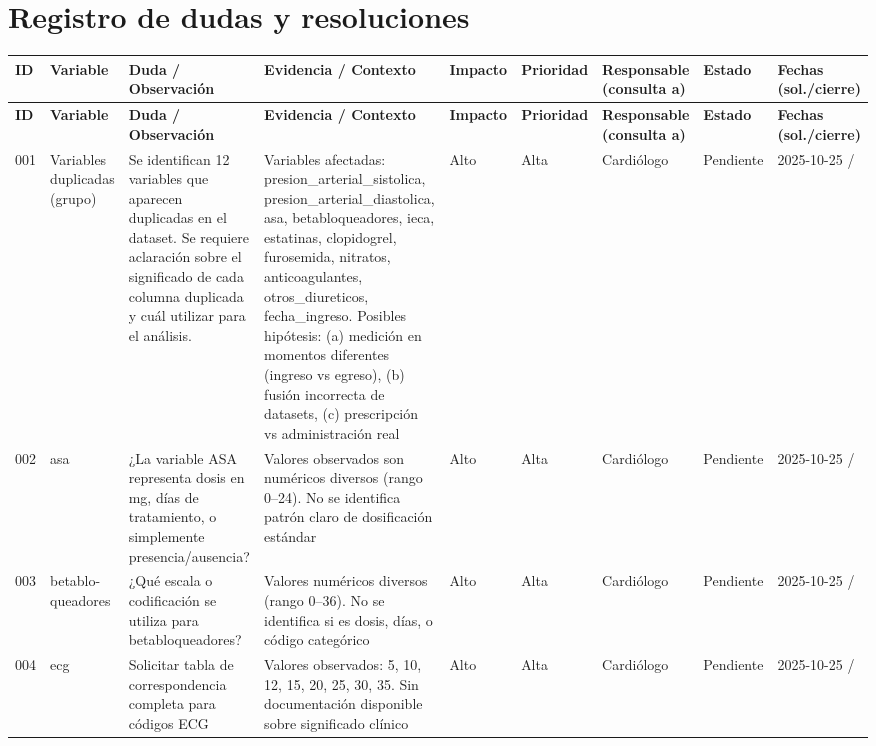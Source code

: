 \documentclass[11pt,a4paper]{article}
\renewcommand{\arraystretch}{1.2}
\begin{document}
\section{Registro de dudas y resoluciones}
\scriptsize
\setlength{\LTleft}{-1cm}
\setlength{\LTright}{-1cm}
\setlength{\tabcolsep}{1.5pt}
\renewcommand{\arraystretch}{1.15}
\begin{longtable}{@{}L{0.035\textwidth} L{0.10\textwidth} L{0.265\textwidth} L{0.17\textwidth} L{0.05\textwidth} L{0.05\textwidth} L{0.095\textwidth} L{0.065\textwidth} L{0.075\textwidth}@{}}
\toprule
\textbf{ID} & \textbf{Variable} & \textbf{Duda / Observación} & \textbf{Evidencia / Contexto} & \textbf{Impacto} & \textbf{Prioridad} & \textbf{Responsable (consulta a)} & \textbf{Estado} & \textbf{Fechas (sol./cierre)} \\
\midrule
\endfirsthead
\toprule
\textbf{ID} & \textbf{Variable} & \textbf{Duda / Observación} & \textbf{Evidencia / Contexto} & \textbf{Impacto} & \textbf{Prioridad} & \textbf{Responsable (consulta a)} & \textbf{Estado} & \textbf{Fechas (sol./cierre)} \\
\midrule
\endhead
\bottomrule
\endfoot
001 & Variables duplicadas (grupo) & Se identifican 12 variables que aparecen duplicadas en el dataset. Se requiere aclaración sobre el significado de cada columna duplicada y cuál utilizar para el análisis. & Variables afectadas: presion\_arterial\_sistolica, presion\_arterial\_diastolica, asa, betabloqueadores, ieca, estatinas, clopidogrel, furosemida, nitratos, anticoagulantes, otros\_diureticos, fecha\_ingreso. Posibles hipótesis: (a) medición en momentos diferentes (ingreso vs egreso), (b) fusión incorrecta de datasets, (c) prescripción vs administración real & Alto & Alta & Cardiólogo & Pendiente & 2025-10-25 / \\
002 & asa & ¿La variable ASA representa dosis en mg, días de tratamiento, o simplemente presencia/ausencia? & Valores observados son numéricos diversos (rango 0--24). No se identifica patrón claro de dosificación estándar & Alto & Alta & Cardiólogo & Pendiente & 2025-10-25 / \\
003 & betablo-
queadores & ¿Qué escala o codificación se utiliza para betabloqueadores? & Valores numéricos diversos (rango 0--36). No se identifica si es dosis, días, o código categórico & Alto & Alta & Cardiólogo & Pendiente & 2025-10-25 / \\
004 & ecg & Solicitar tabla de correspondencia completa para códigos ECG & Valores observados: 5, 10, 12, 15, 20, 25, 30, 35. Sin documentación disponible sobre significado clínico & Alto & Alta & Cardiólogo & Pendiente & 2025-10-25 / \\

\end{longtable}
\end{document}
